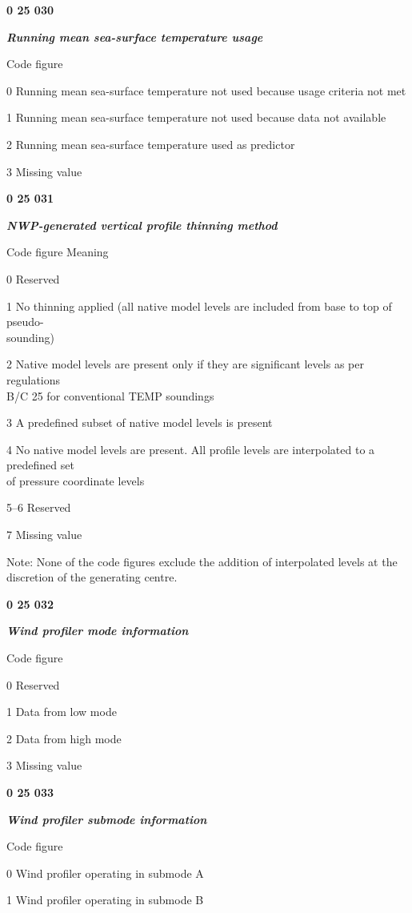 \textbf{0 25 030}

\emph{\textbf{Running mean sea-surface temperature usage}}

Code figure

0 Running mean sea-surface temperature not used because usage criteria not met

1 Running mean sea-surface temperature not used because data not available

2 Running mean sea-surface temperature used as predictor

3 Missing value

\textbf{0 25 031}

\emph{\textbf{NWP-generated vertical profile thinning method}}

Code figure Meaning

0 Reserved

1 No thinning applied (all native model levels are included from base to top of pseudo-\\
sounding)

2 Native model levels are present only if they are significant levels as per regulations\\
B/C 25 for conventional TEMP soundings

3 A predefined subset of native model levels is present

4 No native model levels are present. All profile levels are interpolated to a predefined set\\
of pressure coordinate levels

5--6 Reserved

7 Missing value

Note: None of the code figures exclude the addition of interpolated levels at the discretion of the generating centre.

\textbf{0 25 032}

\emph{\textbf{Wind profiler mode information}}

Code figure

0 Reserved

1 Data from low mode

2 Data from high mode

3 Missing value

\textbf{0 25 033}

\emph{\textbf{Wind profiler submode information}}

Code figure

0 Wind profiler operating in submode A

1 Wind profiler operating in submode B

